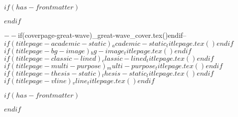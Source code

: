 $if(has-frontmatter)$
  \begin{frontmatter}
$endif$

\begin{titlepage}
$-- %
$if(coverpage-great-wave)$
$_great-wave_cover.tex()$
$endif$

$-- %
$if(titlepage-academic-static)$$_academic-static_titlepage.tex()$$endif$
$if(titlepage-bg-image)$$_bg-image_titlepage.tex()$$endif$
$if(titlepage-classic-lined)$$_classic-lined_titlepage.tex()$$endif$
$if(titlepage-multi-purpose)$$_multi-purpose_titlepage.tex()$$endif$
$if(titlepage-thesis-static)$$_thesis-static_titlepage.tex()$$endif$
$if(titlepage-vline)$$_vline_titlepage.tex()$$endif$

\end{titlepage}
\setcounter{page}{1}
$if(has-frontmatter)$
\end{frontmatter}
$endif$

